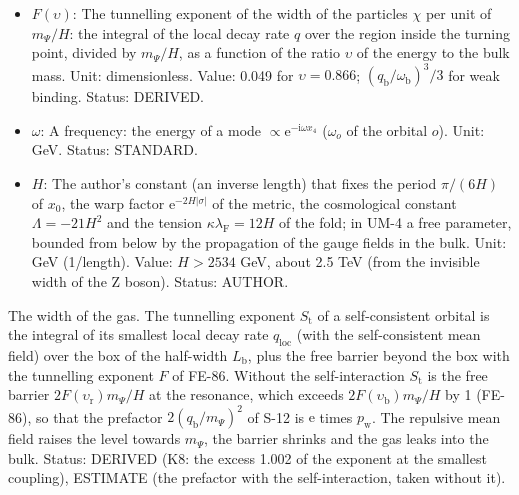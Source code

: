 \documentclass[
  10pt,
]{article}
\begin{document}
\begin{itemize}
  \(\mathrm{d}\sigma = \lvert\cot z\rvert\,\mathrm{d}x_0\),
  \(\sigma = \mathrm{sgn}(\pi/2 - z)\ln(\sin z)/(6H)\) on one period
  \(0 < z < \pi\); \(\sigma = 0\) is the fold \(z = \pi/2\),
  \(\sigma \to \mp\infty\) the tips \(z \to 0, \pi\); one period of
  \(x_0\) is the whole line \(-\infty < \sigma < \infty\). Unit: length.
  Status: DERIVED.
\item
  \(F(\upsilon)\): The tunnelling exponent of the width of the particles
  \(\chi\) per unit of \(m_\Psi/H\): the integral of the local decay
  rate \(q\) over the region inside the turning point, divided by
  \(m_\Psi/H\), as a function of the ratio \(\upsilon\) of the energy to
  the bulk mass. Unit: dimensionless. Value: 0.049 for
  \(\upsilon = 0.866\); \((q_{\mathrm{b}}/\omega_{\mathrm{b}})^3/3\) for
  weak binding. Status: DERIVED.
\item
  \(\omega\): A frequency: the energy of a mode
  \(\propto \mathrm{e}^{-\mathrm{i}\omega x_4}\) (\(\omega_o\) of the
  orbital \(o\)). Unit: GeV. Status: STANDARD.
\item
  \(H\): The author's constant (an inverse length) that fixes the period
  \(\pi/(6H)\) of \(x_0\), the warp factor
  \(\mathrm{e}^{-2H\lvert\sigma\rvert}\) of the metric, the cosmological
  constant \(\Lambda = -21H^2\) and the tension
  \(\kappa\lambda_{\mathrm{F}} = 12H\) of the fold; in UM-4 a free
  parameter, bounded from below by the propagation of the gauge fields
  in the bulk. Unit: GeV (1/length). Value: \(H > 2534\) GeV, about 2.5
  TeV (from the invisible width of the Z boson). Status: AUTHOR.
\end{itemize}

The width of the gas. The tunnelling exponent \(S_{\mathrm{t}}\) of a
self-consistent orbital is the integral of its smallest local decay rate
\(q_{\mathrm{loc}}\) (with the self-consistent mean field) over the box
of the half-width \(L_{\mathrm{b}}\), plus the free barrier beyond the
box with the tunnelling exponent \(F\) of FE-86. Without the
self-interaction \(S_{\mathrm{t}}\) is the free barrier
\(2F(\upsilon_{\mathrm{r}})m_\Psi/H\) at the resonance, which exceeds
\(2F(\upsilon_{\mathrm{b}})m_\Psi/H\) by 1 (FE-86), so that the
prefactor \(2(q_{\mathrm{b}}/m_\Psi)^2\) of S-12 is \(\mathrm{e}\) times
\(p_{\mathrm{w}}\). The repulsive mean field raises the level towards
\(m_\Psi\), the barrier shrinks and the gas leaks into the bulk. Status:
DERIVED (K8: the excess 1.002 of the exponent at the smallest coupling),
ESTIMATE (the prefactor with the self-interaction, taken without it).
\end{document}
